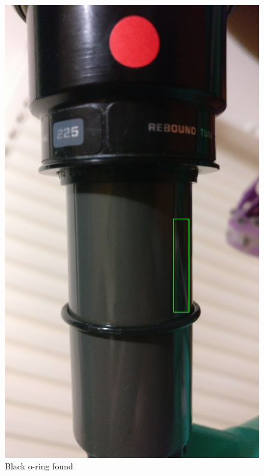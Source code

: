 		\begin{figure}[h!]
			\centering
			\includegraphics[scale=0.1,trim={20cm 40cm 20cm 70cm},clip]{../images/results/fox_oring.jpg}
			\caption{Black o-ring found}
			\label{fig:black_oring}
		\end{figure}
